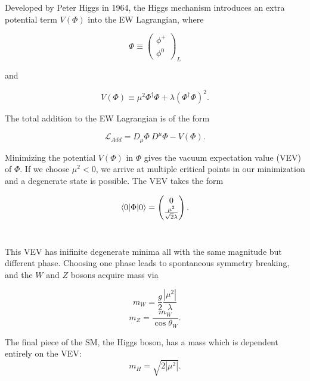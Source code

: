 Developed by Peter Higgs in 1964, the Higgs mechanism introduces an extra potential term $V(\Phi)$ into the EW Lagrangian, where 

\begin{equation}
\Phi \equiv \begin{pmatrix}\phi^{+} \\ \phi^{0}\end{pmatrix}_{L}
\end{equation}

\noindent and

\begin{equation}
V(\Phi) \equiv \mu^{2}\Phi^{\dagger}\Phi + \lambda\left(\Phi^{\dagger}\Phi\right)^{2}.
\end{equation}

\noindent The total addition to the EW Lagrangian is of the form

\begin{equation}
\mathcal{L}_{Add} = D_{\mu}\Phi\ D^{\mu}\Phi - V(\Phi).
\end{equation}

Minimizing the potential $V(\Phi)$ in $\Phi$ gives the vacuum expectation value (VEV) of $\Phi$. If we choose $\mu^{2} < 0$, we arrive at multiple critical points in our minimization and a degenerate state is possible. The VEV takes the form

\begin{equation}
\braket{0|\Phi|0} = \begin{pmatrix}0 \\ \frac{\mu^{2}}{\sqrt{2}\lambda}\end{pmatrix}.
\end{equation}~\cite{srednicki}

This VEV has inifinite degenerate minima all with the same magnitude but different phase. Choosing one phase leads to spontaneous symmetry breaking, and the $W$ and $Z$ bosons acquire mass via\cite{halzen}

\begin{equation}
m_{W} = \frac{g}{2}\frac{|\mu^{2}|}{\lambda}
\end{equation}
\begin{equation}
m_{Z} = \frac{m_{W}}{\cos{\theta_W}}.
\end{equation}

The final piece of the SM, the Higgs boson, has a mass which is dependent entirely on the VEV:
\begin{equation}
m_H = \sqrt{2|\mu^2|}.
\end{equation}

